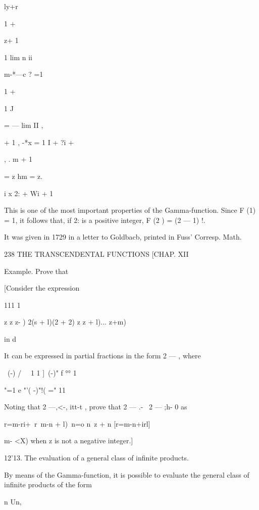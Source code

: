 ly+r 



1 + 



z+ 1 



1 lim n  ii 



m-*---c ? =1 



1 + 



1 J 



=  — lim II , 

  + 1 , -*x   = 1 I   + ?i + 

, . m + 1 

= z hm = z. 

 i x 2: + Wi + 1 

This is one of the most important properties of the Gamma-function. 
Since F (1) = 1, it follows that, if 2: is a positive integer, F (2 ) = (2  — 1) !. 



It was given in 1729 in a letter to Goldbacb, printed in Fuss' Corresp. Math. 



238 THE TRANSCENDENTAL FUNCTIONS [CHAP. XII 

Example. Prove that 

[Consider the expression 

111 1 



z z z-  )  2(s + l)(2 + 2)     z z + l)... z+m) 

in d 

It can be expressed in partial fractions in the form 2 —   , where 

\ (-) / \ \   1 1 ]\ (-)" f °° 1 



"=1 e "'( -)"!( =" 11 

Noting that 2 —,<-, itt-t , prove that 2   — .- \ 2 — ;h- 0 as 

r=m-ri+\ r\  m-n + l)\ n=o n\ z + n [r=m-n+irl] 

m- <X) when z is not a negative integer.] 

12'13. The evaluation of a general class of infinite products. 

By means of the Gamma-function, it is possible to evaluate the general 
class of infinite products of the form 

n Un, 

